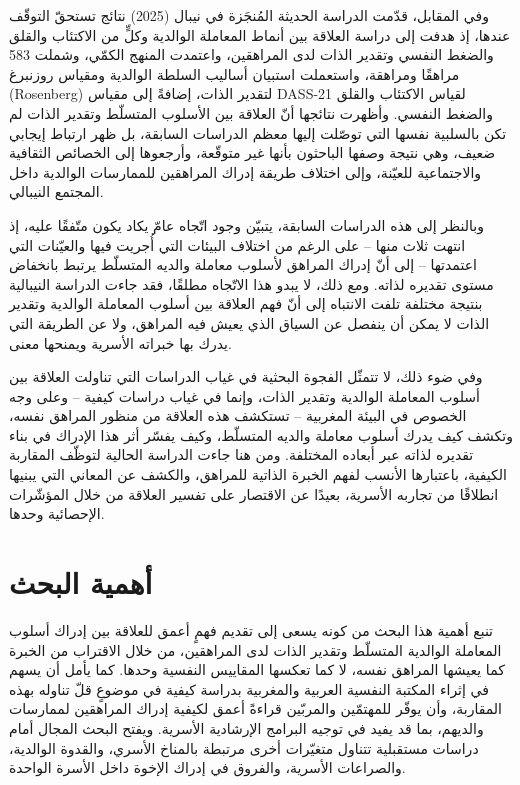 \documentclass[12pt,oneside]{report}
\newcommand{\en}[1]{\textenglish{#1}}
\begin{document}
وفي المقابل، قدّمت الدراسة الحديثة المُنجَزة في نيبال (2025) نتائج تستحقّ التوقّف عندها، إذ هدفت إلى
دراسة العلاقة بين أنماط المعاملة الوالدية وكلٍّ من الاكتئاب والقلق والضغط النفسي وتقدير الذات لدى
المراهقين، واعتمدت المنهج الكمّي، وشملت \en{583} مراهقًا ومراهقة، واستعملت استبيان أساليب السلطة
الوالدية ومقياس روزنبرغ \en{(Rosenberg)} لتقدير الذات، إضافةً إلى مقياس \en{DASS-21} لقياس
الاكتئاب والقلق والضغط النفسي. وأظهرت نتائجها أنّ العلاقة بين الأسلوب المتسلّط وتقدير الذات لم تكن
بالسلبية نفسها التي توصّلت إليها معظم الدراسات السابقة، بل ظهر ارتباط إيجابي ضعيف، وهي نتيجة
وصفها الباحثون بأنها غير متوقّعة، وأرجعوها إلى الخصائص الثقافية والاجتماعية للعيّنة، وإلى اختلاف
طريقة إدراك المراهقين للممارسات الوالدية داخل المجتمع النيبالي.

وبالنظر إلى هذه الدراسات السابقة، يتبيّن وجود اتّجاه عامّ يكاد يكون متّفقًا عليه، إذ انتهت ثلاث منها --
على الرغم من اختلاف البيئات التي أُجريت فيها والعيّنات التي اعتمدتها -- إلى أنّ إدراك المراهق لأسلوب
معاملة والديه المتسلّط يرتبط بانخفاض مستوى تقديره لذاته. ومع ذلك، لا يبدو هذا الاتّجاه مطلقًا، فقد جاءت
الدراسة النيبالية بنتيجة مختلفة تلفت الانتباه إلى أنّ فهم العلاقة بين أسلوب المعاملة الوالدية وتقدير الذات لا
يمكن أن ينفصل عن السياق الذي يعيش فيه المراهق، ولا عن الطريقة التي يدرك بها خبراته الأسرية
ويمنحها معنى.

وفي ضوء ذلك، لا تتمثّل الفجوة البحثية في غياب الدراسات التي تناولت العلاقة بين أسلوب المعاملة
الوالدية وتقدير الذات، وإنما في غياب دراسات كيفية -- وعلى وجه الخصوص في البيئة المغربية -- تستكشف
هذه العلاقة من منظور المراهق نفسه، وتكشف كيف يدرك أسلوب معاملة والديه المتسلّط، وكيف يفسّر أثر
هذا الإدراك في بناء تقديره لذاته عبر أبعاده المختلفة. ومن هنا جاءت الدراسة الحالية لتوظّف المقاربة
الكيفية، باعتبارها الأنسب لفهم الخبرة الذاتية للمراهق، والكشف عن المعاني التي يبنيها انطلاقًا من تجاربه
الأسرية، بعيدًا عن الاقتصار على تفسير العلاقة من خلال المؤشّرات الإحصائية وحدها.

\section{أهمية البحث}
تنبع أهمية هذا البحث من كونه يسعى إلى تقديم فهمٍ أعمق للعلاقة بين إدراك أسلوب المعاملة الوالدية
المتسلّط وتقدير الذات لدى المراهقين، من خلال الاقتراب من الخبرة كما يعيشها المراهق نفسه، لا كما
تعكسها المقاييس النفسية وحدها. كما يأمل أن يسهم في إثراء المكتبة النفسية العربية والمغربية بدراسة كيفية
في موضوعٍ قلّ تناوله بهذه المقاربة، وأن يوفّر للمهتمّين والمربّين قراءةً أعمق لكيفية إدراك المراهقين
لممارسات والديهم، بما قد يفيد في توجيه البرامج الإرشادية الأسرية. ويفتح البحث المجال أمام دراسات
مستقبلية تتناول متغيّرات أخرى مرتبطة بالمناخ الأسري، والقدوة الوالدية، والصراعات الأسرية، والفروق في
إدراك الإخوة داخل الأسرة الواحدة.
\end{document}
